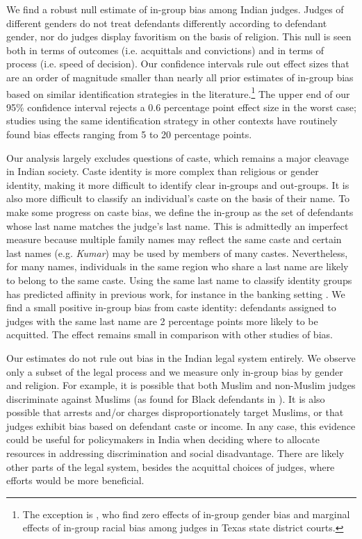 \documentclass[12pt,english]{article}
\begin{document}
We find a robust null estimate of in-group bias among Indian judges. Judges of different genders do not treat defendants differently according to defendant gender, nor do judges display favoritism on the basis of religion. This null is seen both in terms of outcomes (i.e. acquittals and convictions) and in terms of process (i.e. speed of decision). Our confidence intervals rule out effect sizes that are an order of magnitude smaller than nearly all prior estimates of in-group bias based on similar identification strategies in the literature.\footnote{The exception is \cite{lim2016judges}, who find zero effects of in-group gender bias and marginal effects of in-group racial bias among judges in Texas state district courts.} The upper end of our 95\% confidence interval rejects a 0.6 percentage point effect size in the worst case; studies using the same identification strategy in other contexts have routinely found bias effects ranging from 5 to 20 percentage points.

Our analysis largely excludes questions of caste, which remains a major cleavage in Indian society. Caste identity is more complex than religious or gender identity, making it more difficult to identify clear in-groups and out-groups. It is also more difficult to classify an individual's caste on the basis of their name. To make some progress on caste bias, we define the in-group as the set of defendants whose last name matches the judge's last name. This is admittedly an imperfect measure because multiple family names may reflect the same caste and certain last names (e.g. \textit{Kumar}) may be used by members of many castes. Nevertheless, for many names, individuals in the same region who share a last name are likely to belong to the same caste. Using the same last name to classify identity groups has predicted affinity in previous work, for instance in the banking setting \citep{fisman2017cultural}. We find a small positive in-group bias from caste identity: defendants assigned to judges with the same last name are 2 percentage points more likely to be acquitted. The effect remains small in comparison with other studies of bias.

Our estimates do not rule out bias in the Indian legal system entirely. We observe only a subset of the legal process and we measure only in-group bias by gender and religion. For example, it is possible that both Muslim and non-Muslim judges discriminate against Muslims (as found for Black defendants in \citet{arnold2018racial}). It is also possible that arrests and/or charges disproportionately target Muslims,  or that judges exhibit bias based on defendant caste or income. In any case, this evidence could be useful for policymakers in India when deciding where to allocate resources in addressing discrimination and social disadvantage. There are likely other parts of the legal system, besides the acquittal choices of judges, where efforts would be more beneficial. 
\end{document}
